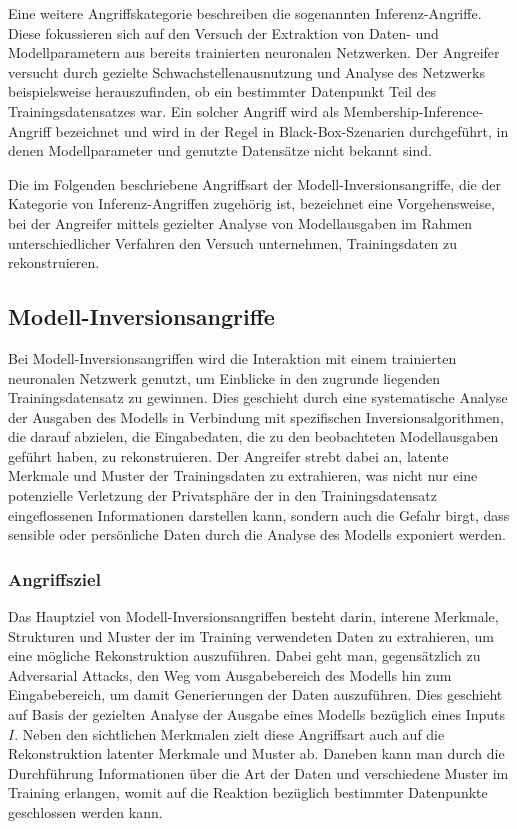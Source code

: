 Eine weitere Angriffskategorie beschreiben die sogenannten Inferenz-Angriffe. Diese fokussieren sich auf den Versuch der Extraktion von Daten- und Modellparametern aus bereits trainierten neuronalen Netzwerken. Der Angreifer versucht durch gezielte Schwachstellenausnutzung und Analyse des Netzwerks beispielsweise herauszufinden, ob ein bestimmter Datenpunkt Teil des Trainingsdatensatzes war. Ein solcher Angriff wird als \glqq Membership-Inference-Angriff\grqq{} bezeichnet und wird in der Regel in Black-Box-Szenarien durchgeführt, in denen Modellparameter und genutzte Datensätze nicht bekannt sind. 

Die im Folgenden beschriebene Angriffsart der \glqq Modell-Inversionsangriffe\grqq{}, die der Kategorie von Inferenz-Angriffen zugehörig ist, bezeichnet eine Vorgehensweise, bei der Angreifer mittels gezielter Analyse von Modellausgaben im Rahmen unterschiedlicher Verfahren den Versuch unternehmen, Trainingsdaten zu rekonstruieren.

\subsection{Modell-Inversionsangriffe} \label{subsec: MIAttack}
Bei Modell-Inversionsangriffen wird die Interaktion mit einem trainierten neuronalen Netzwerk genutzt, um Einblicke in den zugrunde liegenden Trainingsdatensatz zu gewinnen. Dies geschieht durch eine systematische Analyse der Ausgaben des Modells in Verbindung mit spezifischen Inversionsalgorithmen, die darauf abzielen, die Eingabedaten, die zu den beobachteten Modellausgaben geführt haben, zu rekonstruieren. Der Angreifer strebt dabei an, latente Merkmale und Muster der Trainingsdaten zu extrahieren, was nicht nur eine potenzielle Verletzung der Privatsphäre der in den Trainingsdatensatz eingeflossenen Informationen darstellen kann, sondern auch die Gefahr birgt, dass sensible oder persönliche Daten durch die Analyse des Modells exponiert werden.
\subsubsection{Angriffsziel}
Das Hauptziel von Modell-Inversionsangriffen besteht darin, interene Merkmale, Strukturen und Muster der im Training verwendeten Daten zu extrahieren, um eine mögliche Rekonstruktion auszuführen. Dabei geht man, gegensätzlich zu \glqq Adversarial Attacks\grqq{}, den Weg vom Ausgabebereich des Modells hin zum Eingabebereich, um damit Generierungen der Daten auszuführen. Dies geschieht auf Basis der gezielten Analyse der Ausgabe eines Modells bezüglich eines Inputs $I$. Neben den sichtlichen Merkmalen zielt diese Angriffsart auch auf die Rekonstruktion latenter Merkmale und Muster ab. Daneben kann man durch die Durchführung Informationen über die Art der Daten und verschiedene Muster im Training erlangen, womit auf die Reaktion bezüglich bestimmter Datenpunkte geschlossen werden kann.


